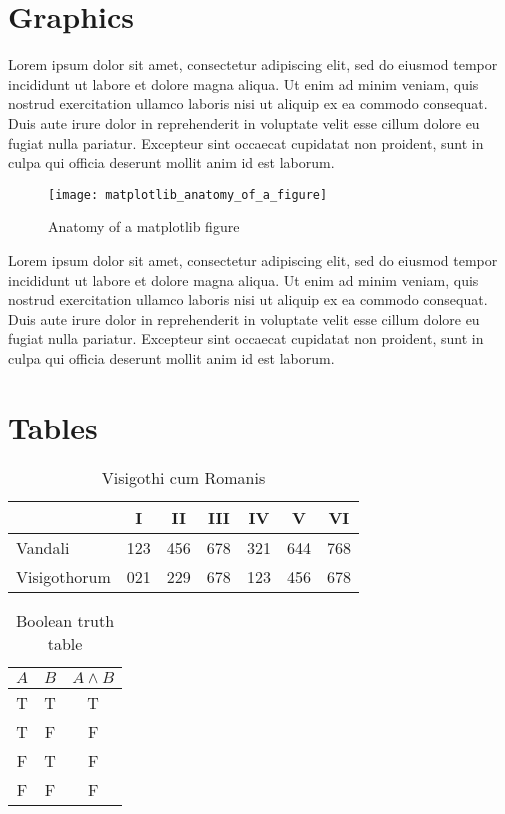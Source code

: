\documentclass[10pt, letterpaper, twoside]{article}
\theoremstyle{myenv}
\theoremstyle{mytheorem}
\theoremstyle{mydefinition}
\begin{document}
\newpage
\section{Graphics}
\label{sec:graphics}
Lorem ipsum dolor sit amet, consectetur adipiscing elit, sed do eiusmod tempor incididunt ut labore et dolore magna aliqua. Ut enim ad minim veniam, quis nostrud exercitation ullamco laboris nisi ut aliquip ex ea commodo consequat. Duis aute irure dolor in reprehenderit in voluptate velit esse cillum dolore eu fugiat nulla pariatur. Excepteur sint occaecat cupidatat non proident, sunt in culpa qui officia deserunt mollit anim id est laborum.

\begin{figure}[H]
\texttt{[image: matplotlib\_anatomy\_of\_a\_figure]}
\caption{Anatomy of a matplotlib figure}
\end{figure}
\label{fig:anatomy_of_a_matplotlib_figure}

Lorem ipsum dolor sit amet, consectetur adipiscing elit, sed do eiusmod tempor incididunt ut labore et dolore magna aliqua. Ut enim ad minim veniam, quis nostrud exercitation ullamco laboris nisi ut aliquip ex ea commodo consequat. Duis aute irure dolor in reprehenderit in voluptate velit esse cillum dolore eu fugiat nulla pariatur. Excepteur sint occaecat cupidatat non proident, sunt in culpa qui officia deserunt mollit anim id est laborum.

\newpage
\section{Tables}
\label{sec:tables}

\begin{table}[H]
\begin{flushleft}
\begin{tabular}{lcccccc}
\toprule
& I &  II & III & IV & V & VI \\
\midrule
Vandali     & 123 & 456 & 678 & 321 & 644 & 768  \\
Visigothorum & 021 & 229 & 678 & 123 & 456 & 678 \\
\bottomrule
\end{tabular}
\label{tab:visigothi_cum_romanis}
\caption{Visigothi cum Romanis}
\end{flushleft}
\end{table}

\begin{table}[H]
\begin{flushleft}
\begin{tabular}{ccc}
\toprule
$A$ & $B$ & $ A \land B$ \\
\midrule
T & T & T \\
T & F & F \\
F & T & F \\
F & F & F \\
\bottomrule
\end{tabular}
\label{tab:boolean_truth_table}
\caption{Boolean truth table}
\end{flushleft}
\end{table}
\end{document}
